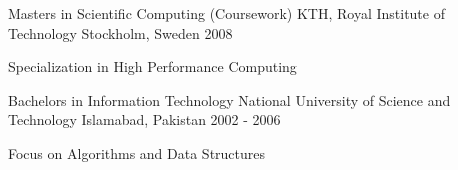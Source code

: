 


\begin{cventries}

\cventry
{Masters in Scientific Computing (Coursework)} %
{KTH, Royal Institute of Technology} %
{Stockholm, Sweden} %
{2008} %
{
    \begin{cvitems}
    	\item{Specialization in High Performance Computing}
    \end{cvitems}
}


\cventry
{Bachelors in Information Technology} %
{National University of Science and Technology} %
{Islamabad, Pakistan} %
{2002 - 2006} %
{
    \begin{cvitems}
    	\item{Focus on Algorithms and Data Structures}
    \end{cvitems}
}


\end{cventries}

